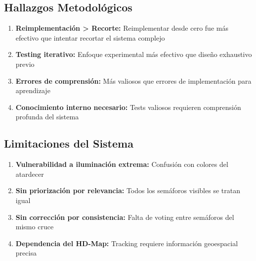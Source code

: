 \subsection{Hallazgos Metodológicos}

\begin{enumerate}
    \item \textbf{Reimplementación > Recorte:} Reimplementar desde cero fue más efectivo que intentar recortar el sistema complejo
    \item \textbf{Testing iterativo:} Enfoque experimental más efectivo que diseño exhaustivo previo
    \item \textbf{Errores de comprensión:} Más valiosos que errores de implementación para aprendizaje
    \item \textbf{Conocimiento interno necesario:} Tests valiosos requieren comprensión profunda del sistema
\end{enumerate}

\subsection{Limitaciones del Sistema}

\begin{enumerate}
    \item \textbf{Vulnerabilidad a iluminación extrema:} Confusión con colores del atardecer
    \item \textbf{Sin priorización por relevancia:} Todos los semáforos visibles se tratan igual
    \item \textbf{Sin corrección por consistencia:} Falta de voting entre semáforos del mismo cruce
    \item \textbf{Dependencia del HD-Map:} Tracking requiere información geoespacial precisa
\end{enumerate}